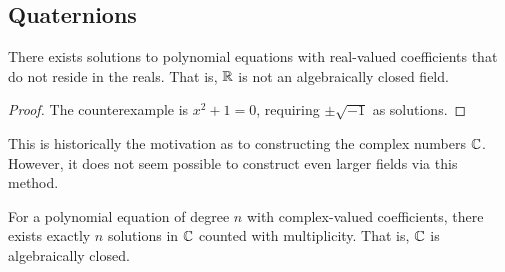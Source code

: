 \subsection{Quaternions}

\begin{lemma}
    There exists solutions to polynomial equations with real-valued coefficients
    that do not reside in the reals.
    That is, \(\mathbb{R}\) is not an algebraically closed field.
\end{lemma}
\begin{proof}
    The counterexample is \(x^2 + 1 = 0\),
    requiring \(\pm\sqrt{-1}\) as solutions.
\end{proof}
\begin{remark}
    This is historically the motivation
    as to constructing the complex numbers \(\mathbb{C}\).
    However, it does not seem possible to construct
    even larger fields via this method.
\end{remark}
\begin{theorem}
    For a polynomial equation of degree \(n\) with complex-valued coefficients,
    there exists exactly \(n\) solutions in \(\mathbb{C}\) counted with multiplicity.
    That is, \(\mathbb{C}\) is algebraically closed.
\end{theorem}
